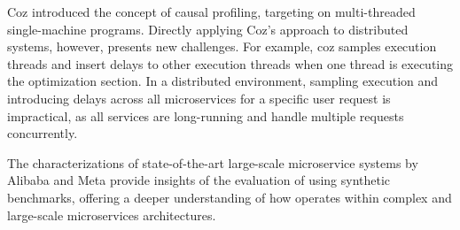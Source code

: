 Coz \cite{coz} introduced the concept of causal profiling, targeting on multi-threaded single-machine programs. Directly applying Coz's approach to distributed systems, however, presents new challenges. 
For example, coz samples execution threads and insert delays to other execution threads when one thread is executing the optimization section. In a distributed environment, sampling execution and introducing 
delays across all microservices for a specific user request is impractical, as all services are long-running and handle multiple requests concurrently.


 The characterizations of state-of-the-art large-scale microservice systems by Alibaba \cite{alibaba} and Meta \cite{meta} provide insights of the evaluation of \ours using synthetic benchmarks, offering a deeper understanding of how \ours operates within complex and large-scale microservices architectures.